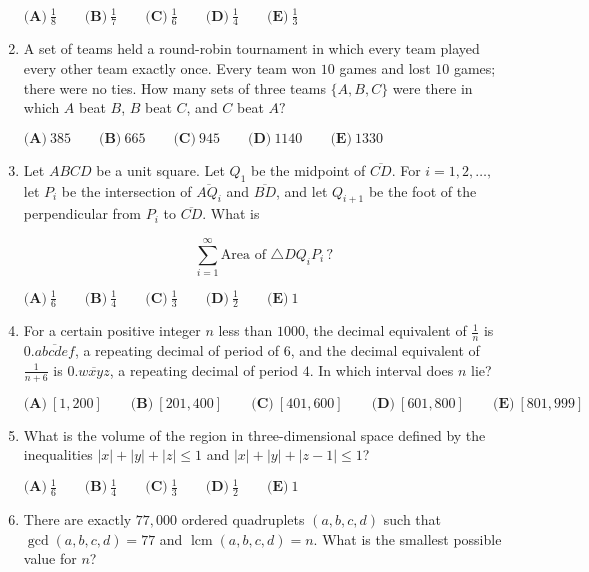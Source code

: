\documentclass{article}
\begin{document}
\begin{enumerate}[label=\arabic*., itemsep=0.5em]
\(\textbf{(A)}\ \frac{1}{8} \qquad
\textbf{(B)}\ \frac{1}{7} \qquad
\textbf{(C)}\ \frac{1}{6} \qquad
\textbf{(D)}\ \frac{1}{4} \qquad
\textbf{(E)}\ \frac{1}{3}\)\par \vspace{0.5em}\item A set of teams held a round-robin tournament in which every team played every other team exactly once. Every team won \(10\) games and lost \(10\) games; there were no ties. How many sets of three teams \(\{A, B, C\}\) were there in which \(A\) beat \(B\), \(B\) beat \(C\), and \(C\) beat \(A?\)

\(\textbf{(A)}\ 385 \qquad
\textbf{(B)}\ 665 \qquad
\textbf{(C)}\ 945 \qquad
\textbf{(D)}\ 1140 \qquad
\textbf{(E)}\ 1330\)\par \vspace{0.5em}\item Let \(ABCD\) be a unit square. Let \(Q_1\) be the midpoint of \(\overline{CD}\). For \(i=1,2,\dots,\) let \(P_i\) be the intersection of \(\overline{AQ_i}\) and \(\overline{BD}\), and let \(Q_{i+1}\) be the foot of the perpendicular from \(P_i\) to \(\overline{CD}\). What is 

\begin{equation*}
\sum_{i=1}^{\infty} \text{Area of } \triangle DQ_i P_i \, ?
\end{equation*}


\(\textbf{(A)}\ \frac{1}{6} \qquad
\textbf{(B)}\ \frac{1}{4} \qquad
\textbf{(C)}\ \frac{1}{3} \qquad
\textbf{(D)}\ \frac{1}{2} \qquad
\textbf{(E)}\ 1\)\par \vspace{0.5em}\item For a certain positive integer \(n\) less than \(1000\), the decimal equivalent of \(\frac{1}{n}\) is \(0.\overline{abcdef}\), a repeating decimal of period of \(6\), and the decimal equivalent of \(\frac{1}{n+6}\) is \(0.\overline{wxyz}\), a repeating decimal of period \(4\). In which interval does \(n\) lie?

\(\textbf{(A)}\ [1,200]\qquad\textbf{(B)}\ [201,400]\qquad\textbf{(C)}\ [401,600]\qquad\textbf{(D)}\ [601,800]\qquad\textbf{(E)}\ [801,999]\)\par \vspace{0.5em}\item What is the volume of the region in three-dimensional space defined by the inequalities \(|x|+|y|+|z|\le1\) and \(|x|+|y|+|z-1|\le1\)?

\(\textbf{(A)}\ \frac{1}{6}\qquad\textbf{(B)}\ \frac{1}{4}\qquad\textbf{(C)}\ \frac{1}{3}\qquad\textbf{(D)}\ \frac{1}{2}\qquad\textbf{(E)}\ 1\)\par \vspace{0.5em}\item There are exactly \(77,000\) ordered quadruplets \((a, b, c, d)\) such that \(\gcd(a, b, c, d) = 77\) and \(\operatorname{lcm}(a, b, c, d) = n\). What is the smallest possible value for \(n\)?


\end{enumerate}
\end{document}
